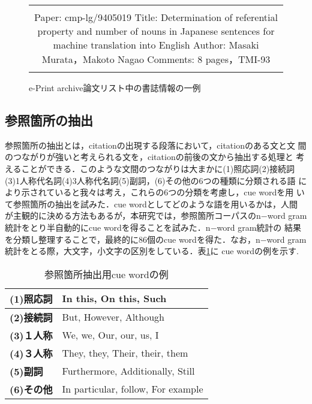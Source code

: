 \begin{figure}[t]
\begin{center}
\begin{tabular}{|c|}\hline
\begin{minipage}[c]{13.5cm}
{\bf
\flushleft{
\vspace{0.3cm}
\begin{quote}
{\footnotesize
\begin{verbatim}
\\
Paper: cmp-lg/9405019
Title: Determination of referential property and number of nouns in Japanese
sentences for machine translation into English
Author: Masaki Murata，Makoto Nagao
Comments: 8 pages，TMI-93
\\
\end{verbatim}
}
\end{quote}
}
}
\vspace{0.3cm}
\end{minipage}
 \\ \hline
\end{tabular}
\end{center}
\caption{e-Print archive論文リスト中の書誌情報の一例\label{fig:e-list}}
\end{figure}
\normalsize

\subsection{参照箇所の抽出}

参照箇所の抽出とは，citationの出現する段落において，citationのある文と文
間のつながりが強いと考えられる文を，citationの前後の文から抽出する処理と
考えることができる．このような文間のつながりは大まかに(1)照応詞(2)接続詞
(3)1人称代名詞(4)3人称代名詞(5)副詞，(6)その他の6つの種類に分類される語
により示されていると我々は考え，これらの6つの分類を考慮し，cue wordを用
いて参照箇所の抽出を試みた．cue wordとしてどのような語を用いるかは，人間
が主観的に決める方法もあるが，本研究では，参照箇所コーパスのn$-$word
gram統計をとり半自動的にcue wordを得ることを試みた．n$-$word gram統計の
結果を分類し整理することで，最終的に86個のcue wordを得た．なお，n$-$word
gram統計をとる際，大文字，小文字の区別をしている．表\ref{table:ra_cue}に
cue wordの例を示す.

\begin{table}[t]
\caption{参照箇所抽出用cue wordの例\label{table:ra_cue}}
\begin{center}
\begin{tabular}{|l|l|}\hline
 {\bf (1)照応詞} & In this, On this, Such \\ \hline
 {\bf (2)接続詞} & But, However, Although \\ \hline
 {\bf (3)１人称}  & We, we, Our, our, us, I \\ \hline
 {\bf (4)３人称}  & They, they, Their, their, them \\ \hline
 {\bf (5)副詞} & Furthermore, Additionally, Still \\ \hline
 {\bf (6)その他} & In particular, follow, For example \\ \hline
\end{tabular}
\end{center}
\end{table}

